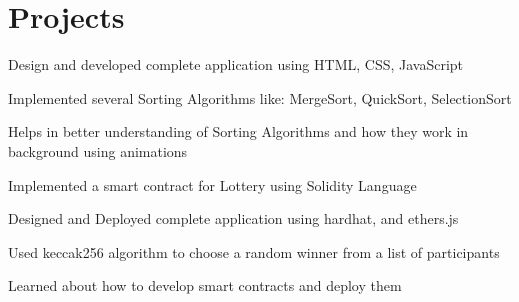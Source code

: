 \documentclass[letterpaper]{deedy-resume} %
\begin{document}
\hfill
%
%
\begin{minipage}[t]{0.52\textwidth} %


\section{Projects}
\subsubsectionspace
{}
\subsubsectionspace
\vspace{\topsep} %
\begin{tightitemize}
\item Design and developed complete application using HTML, CSS, JavaScript
\item Implemented several Sorting Algorithms like: MergeSort, QuickSort, SelectionSort
\item Helps in better understanding of Sorting Algorithms and how they work in background using animations
\end{tightitemize}

\sectionspace %

\subsubsectionspace
\begin{tightitemize}
\item Implemented a smart contract for Lottery using Solidity Language
\item Designed and Deployed complete application using hardhat, and ethers.js
\item Used keccak256 algorithm to choose a random winner from a list of participants
\item Learned about how to develop smart contracts and deploy them
\end{tightitemize}

\sectionspace %




\end{minipage}
\end{document}
